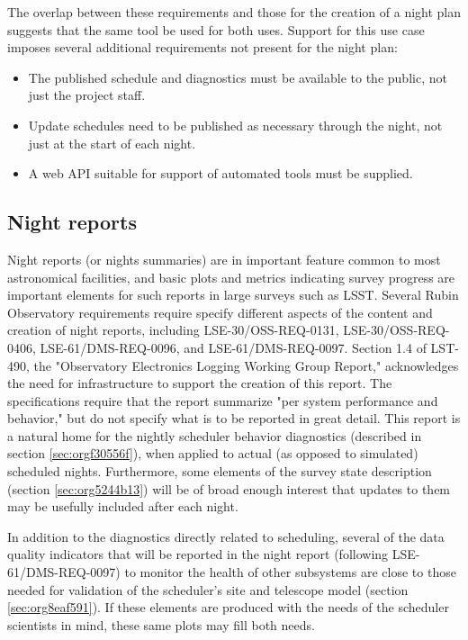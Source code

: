 The overlap between these requirements and those for the creation of a night plan suggests that the same tool be used for both uses. 
Support for this use case imposes several additional requirements not present for the night plan:
\begin{itemize}
\item The published schedule and diagnostics must be available to the public, not just the project staff.
\item Update schedules need to be published as necessary through the night, not just at the start of each night.
\item A web API suitable for support of automated tools must be supplied.
\end{itemize}

\subsection{Night reports}
\label{sec:org0705149}
Night reports (or nights summaries) are in important feature common to most astronomical facilities, and basic plots and metrics indicating survey progress are important elements for such reports in large surveys such as LSST.
Several Rubin Observatory requirements require specify different aspects of the content and creation of night reports, including LSE-30/OSS-REQ-0131, LSE-30/OSS-REQ-0406, LSE-61/DMS-REQ-0096, and LSE-61/DMS-REQ-0097. Section 1.4 of LST-490, the "Observatory Electronics Logging Working Group Report," acknowledges the need for infrastructure to support the creation of this report.
The specifications require that the report summarize "per system performance and behavior," but do not specify what is to be reported in great detail.
This report is a natural home for the nightly scheduler behavior diagnostics (described in section \ref{sec:orgf30556f}), when applied to actual (as opposed to simulated) scheduled nights.
Furthermore, some elements of the survey state description (section \ref{sec:org5244b13}) will be of broad enough interest that updates to them may be usefully included after each night.

In addition to the diagnostics directly related to scheduling, several of the data quality indicators that will be reported in the night report (following LSE-61/DMS-REQ-0097) to monitor the health of other subsystems are close to those needed for validation of the scheduler's site and telescope model (section \ref{sec:org8eaf591}). If these elements are produced with the needs of the scheduler scientists in mind, these same plots may fill both needs.

